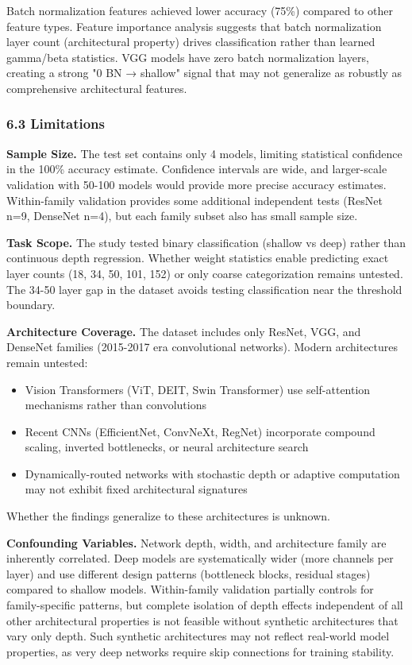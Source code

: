 Batch normalization features achieved lower accuracy (75\%) compared to other feature types. Feature importance analysis suggests that batch normalization layer count (architectural property) drives classification rather than learned gamma/beta statistics. VGG models have zero batch normalization layers, creating a strong "0 BN → shallow" signal that may not generalize as robustly as comprehensive architectural features.

\subsubsection{6.3 Limitations}

\textbf{Sample Size.} The test set contains only 4 models, limiting statistical confidence in the 100\% accuracy estimate. Confidence intervals are wide, and larger-scale validation with 50-100 models would provide more precise accuracy estimates. Within-family validation provides some additional independent tests (ResNet n=9, DenseNet n=4), but each family subset also has small sample size.

\textbf{Task Scope.} The study tested binary classification (shallow vs deep) rather than continuous depth regression. Whether weight statistics enable predicting exact layer counts (18, 34, 50, 101, 152) or only coarse categorization remains untested. The 34-50 layer gap in the dataset avoids testing classification near the threshold boundary.

\textbf{Architecture Coverage.} The dataset includes only ResNet, VGG, and DenseNet families (2015-2017 era convolutional networks). Modern architectures remain untested:
\begin{itemize}
\item Vision Transformers (ViT, DEIT, Swin Transformer) use self-attention mechanisms rather than convolutions
\item Recent CNNs (EfficientNet, ConvNeXt, RegNet) incorporate compound scaling, inverted bottlenecks, or neural architecture search
\item Dynamically-routed networks with stochastic depth or adaptive computation may not exhibit fixed architectural signatures
\end{itemize}

Whether the findings generalize to these architectures is unknown.

\textbf{Confounding Variables.} Network depth, width, and architecture family are inherently correlated. Deep models are systematically wider (more channels per layer) and use different design patterns (bottleneck blocks, residual stages) compared to shallow models. Within-family validation partially controls for family-specific patterns, but complete isolation of depth effects independent of all other architectural properties is not feasible without synthetic architectures that vary only depth. Such synthetic architectures may not reflect real-world model properties, as very deep networks require skip connections for training stability.

